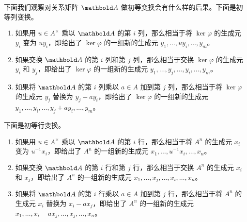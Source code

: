 下面我们观察对关系矩阵 $\mat A$ 做初等变换会有什么样的后果。下面是初等列变换。
\begin{enumerate}
  \item 如果用 $u\in A^\times$ 乘以 $\mat A$ 的第 $i$ 列，那么相当于将 $\ker\varphi$ 的生成元
  $y_i$ 变为 $uy_i$，即给出了 $\ker\varphi$ 的一组新的生成元
  $y_1,\dots,uy_i,\dots,y_m$。
  \item 如果交换 $\mat A$ 的第 $i$ 列和第 $j$ 列，那么相当于交换 $\ker\varphi$ 的生成元
  $y_i$ 和 $y_j$，即给出了 $\ker\varphi$ 的一组新的生成元
  $y_1,\dots,y_j,\dots ,y_i,\dots,y_m$。
  \item 如果将 $\mat A$ 的第 $i$ 列乘以 $a\in A$ 加到第 $j$ 列，那么相当于将 $\ker\varphi$
  的生成元 $y_j$ 替换为 $y_j+ay_i$，即给出了 $\ker\varphi$ 的一组新的生成元
  $y_1,\dots,y_i,\dots ,y_j+ay_i,\dots,y_m$。
\end{enumerate}
下面是初等行变换。
\begin{enumerate}
  \item 如果用 $u\in A^\times$ 乘以 $\mat A$ 的第 $i$ 行，那么相当于将 $A^n$ 的生成元
  $x_i$ 变为 $u^{-1}x_i$，即给出了 $A^n$ 的一组新的生成元
  $x_1,\dots,u^{-1}x_i,\dots,x_n$。
  \item 如果交换 $\mat A$ 的第 $i$ 行和第 $j$ 行，那么相当于交换 $A^n$ 的生成元
  $x_i$ 和 $x_j$，即给出了 $A^n$ 的一组新的生成元
  $x_1,\dots,x_j,\dots ,x_i,\dots,x_n$。
  \item 如果将 $\mat A$ 的第 $i$ 行乘以 $a\in A$ 加到第 $j$ 行，那么相当于将 $A^n$
  的生成元 $x_i$ 替换为 $x_i-ax_j$，即给出了 $A^n$ 的一组新的生成元
  $x_1,\dots,x_i-ax_j,\dots ,x_j,\dots,x_n$。
\end{enumerate}

